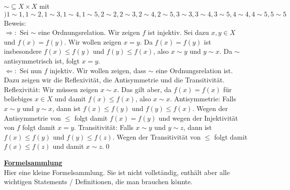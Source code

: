 \begin{loesung}
$\sim\subseteq X\times X$ mit $)1\sim 1, 1\sim 2, 1\sim 3, 1\sim 4, 1\sim 5, 2\sim 2, 2\sim 3, 2\sim 4, 2\sim 5, 3\sim 3, 3\sim 4, 3\sim 5, 4\sim 4, 4\sim 5, 5\sim 5$\\
Beweis:\\
$\Rightarrow:$ Sei $\sim$ eine Ordnungsrelation. Wir zeigen $f$ ist injektiv. Sei dazu $x,y\in X$ und $f(x)=f(y)$. Wir wollen zeigen $x=y$. Da $f(x)=f(y)$ ist insbesondere $f(x)\leq f(y)$ und $f(y)\leq f(x)$, also $x\sim y$ und $y\sim x$. Da $\sim$ antisymmetrisch ist, folgt $x=y$.\\
$\Leftarrow:$ Sei nun $f$ injektiv. Wir wollen zeigen, dass $\sim$ eine Ordnungsrelation ist. Dazu zeigen wir die Reflexivität, die Antisymmetrie und die Transitivität. Reflexivität: Wir müssen zeigen $x\sim x$. Das gilt aber, da $f(x)=f(x)$ für beliebiges $x\in X$ und damit $f(x)\leq f(x)$, also $x\sim x$. Antisymmetrie: Falls $x\sim y$ und $y\sim x$, dann ist $f(x)\leq f(y)$ und $f(y)\leq f(x)$. Wegen der Antisymmetrie von $\leq$ folgt damit $f(x)=f(y)$ und wegen der Injektivität von $f$ folgt damit $x=y$. Transitivität: Falls $x\sim y$ und $y\sim z$, dann ist $f(x)\leq f(y)$ und $f(y)\leq f(z)$. Wegen der Transitivität von $\leq$ folgt damit $f(x)\leq f(z)$ und damit $x\sim z$.\qed
\end{loesung}
\hspace{5cm}
\newpage
\underline{\textbf{Formelsammlung}}\\
Hier eine kleine Formelsammlung. Sie ist nicht vollständig, enthält aber alle wichtigen Statements / Definitionen, die man brauchen könnte.
